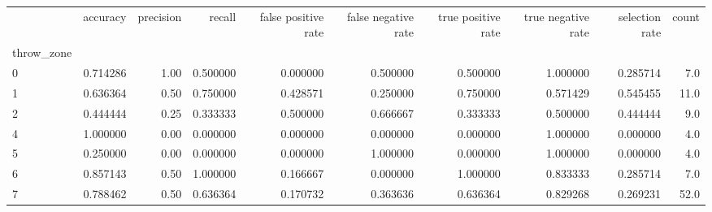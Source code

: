 \begin{tabular}{lrrrrrrrrr}
\toprule
{} &  accuracy &  precision &    recall &  false positive rate &  false negative rate &  true positive rate &  true negative rate &  selection rate &  count \\
throw\_zone &           &            &           &                      &                      &                     &                     &                 &        \\
\midrule
0          &  0.714286 &       1.00 &  0.500000 &             0.000000 &             0.500000 &            0.500000 &            1.000000 &        0.285714 &    7.0 \\
1          &  0.636364 &       0.50 &  0.750000 &             0.428571 &             0.250000 &            0.750000 &            0.571429 &        0.545455 &   11.0 \\
2          &  0.444444 &       0.25 &  0.333333 &             0.500000 &             0.666667 &            0.333333 &            0.500000 &        0.444444 &    9.0 \\
4          &  1.000000 &       0.00 &  0.000000 &             0.000000 &             0.000000 &            0.000000 &            1.000000 &        0.000000 &    4.0 \\
5          &  0.250000 &       0.00 &  0.000000 &             0.000000 &             1.000000 &            0.000000 &            1.000000 &        0.000000 &    4.0 \\
6          &  0.857143 &       0.50 &  1.000000 &             0.166667 &             0.000000 &            1.000000 &            0.833333 &        0.285714 &    7.0 \\
7          &  0.788462 &       0.50 &  0.636364 &             0.170732 &             0.363636 &            0.636364 &            0.829268 &        0.269231 &   52.0 \\
\bottomrule
\end{tabular}
